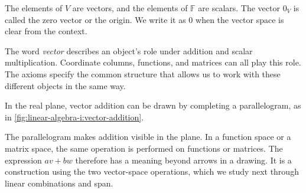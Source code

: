 The elements of \(V\) are vectors, and the elements of \(\mathbb F\) are
scalars. The vector \(0_V\) is called the zero vector or the origin.
We write it as \(0\) when the vector space is clear from the context.

The word \emph{vector} describes an object's role under addition and scalar
multiplication. Coordinate columns, functions, and matrices can all play
this role. The axioms specify the common structure that allows us to work
with these different objects in the same way.

In the real plane, vector addition can be drawn by completing a
parallelogram, as in \autoref{fig:linear-algebra-i:vector-addition}.
\begin{marginfigure}
  \centering
  
  \caption[Vector addition]{A real-plane schematic of \(v+w\).
    The dashed sides are translated copies of \(v\) and \(w\).}
  \label{fig:linear-algebra-i:vector-addition}
\end{marginfigure}

The parallelogram makes addition visible in the plane. In a function space
or a matrix space, the same operation is performed on functions or matrices.
The expression \(av+bw\) therefore has a meaning beyond arrows in a drawing.
It is a construction using the two vector-space operations, which we study
next through linear combinations and span.


